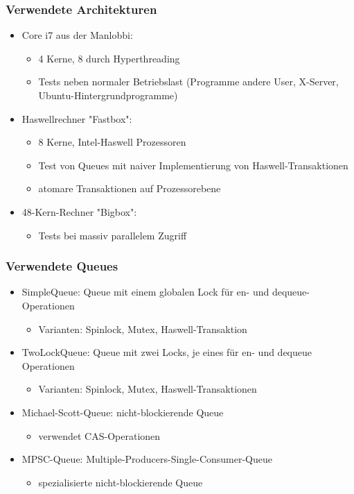 \documentclass[svgnames]{beamer}
\begin{document}
\begin{frame}
\frametitle{Verwendete Architekturen}
\begin{itemize}
 \item Core i7 aus der Manlobbi:
\begin{itemize}
 \item 4 Kerne, 8 durch Hyperthreading
 \item Tests neben normaler Betriebslast (Programme andere User, X-Server, Ubuntu-Hintergrundprogramme)
\end{itemize}
 \item Haswellrechner "Fastbox":
\begin{itemize}
 \item 8 Kerne, Intel-Haswell Prozessoren
 \item Test von Queues mit naiver Implementierung von Haswell-Transaktionen
 \item atomare Transaktionen auf Prozessorebene
\end{itemize}
 \item 48-Kern-Rechner "Bigbox":
\begin{itemize}
 \item Tests bei massiv parallelem Zugriff
\end{itemize}
\end{itemize}
\end{frame}

\begin{frame}
\frametitle{Verwendete Queues}
\begin{itemize}
 \item SimpleQueue: Queue mit einem globalen Lock f\"ur en- und dequeue-Operationen
\begin{itemize}
 \item Varianten: Spinlock, Mutex, Haswell-Transaktion
\end{itemize}
 \item TwoLockQueue: Queue mit zwei Locks, je eines f\"ur en- und dequeue Operationen
\begin{itemize}
 \item Varianten: Spinlock, Mutex, Haswell-Transaktionen
\end{itemize}
 \item Michael-Scott-Queue: nicht-blockierende Queue
\begin{itemize}
 \item verwendet CAS-Operationen
\end{itemize}
 \item MPSC-Queue: Multiple-Producers-Single-Consumer-Queue
\begin{itemize}
\item spezialisierte nicht-blockierende Queue
\end{itemize}
\end{itemize}
\end{frame}
\end{document}
